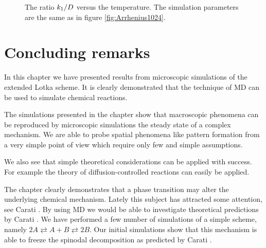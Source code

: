 \begin{figure}
  \begin{center}
    
  \end{center}
  \caption[Plot of $k_1/D$]{The ratio \protect$k_1/D\protect$ versus the
    temperature. The simulation parameters are the same as in figure
    \protect\ref{fig:Arrhenius1024}.\label{fig:kDratio}}
\end{figure}


\section{Concluding remarks}
In this chapter we have presented results from microscopic simulations
of the extended Lotka scheme. It is clearly demonstrated that the
technique of MD can be used to simulate chemical reactions.

The simulations presented in the chapter show that macroscopic
phenomena can be reproduced by microscopic simulations \eg the steady
state of a complex mechanism. We are able to probe spatial phenomena
like pattern formation from a very simple point of view which require
only few and simple assumptions.

We also see that simple theoretical considerations can be applied with
success. For example the theory of diffusion-controlled reactions can
easily be applied.

The chapter clearly demonstrates that a phase transition may alter the
underlying chemical mechanism. Lately this subject has attracted some
attention, see \eg Carati \etal \cite{Carati97}. By using MD we would be able
to investigate theoretical predictions by Carati \etal. We have performed a
few number of simulations of a simple scheme, namely
$2A \rightleftarrows A + B \rightleftarrows 2B$. Our initial simulations show
that this mechanism is able to freeze the spinodal decomposition as
predicted by Carati \etal.
